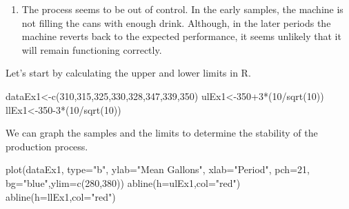 \documentclass[
  letterpaper,
  DIV=11,
  numbers=noendperiod]{scrreprt}
\newenvironment{Shaded}{\begin{snugshade}}{\end{snugshade}}
\newcommand{\AttributeTok}[1]{\textcolor[rgb]{0.40,0.45,0.13}{#1}}
\newcommand{\DecValTok}[1]{\textcolor[rgb]{0.68,0.00,0.00}{#1}}
\newcommand{\FunctionTok}[1]{\textcolor[rgb]{0.28,0.35,0.67}{#1}}
\newcommand{\NormalTok}[1]{\textcolor[rgb]{0.00,0.23,0.31}{#1}}
\newcommand{\OtherTok}[1]{\textcolor[rgb]{0.00,0.23,0.31}{#1}}
\newcommand{\SpecialCharTok}[1]{\textcolor[rgb]{0.37,0.37,0.37}{#1}}
\newcommand{\StringTok}[1]{\textcolor[rgb]{0.13,0.47,0.30}{#1}}
\providecommand{\tightlist}{%
  \setlength{\itemsep}{0pt}\setlength{\parskip}{0pt}}\usepackage{longtable,booktabs,array}
\begin{document}
\begin{blackbox}

\begin{enumerate}
\def\labelenumi{\arabic{enumi}.}
\tightlist
\item
  The process seems to be out of control. In the early samples, the
  machine is not filling the cans with enough drink. Although, in the
  later periods the machine reverts back to the expected performance, it
  seems unlikely that it will remain functioning correctly.
\end{enumerate}

\end{blackbox}

Let's start by calculating the upper and lower limits in R.

\begin{Shaded}
\begin{Highlighting}[numbers=left,,]
\NormalTok{dataEx1}\OtherTok{\textless{}{-}}\FunctionTok{c}\NormalTok{(}\DecValTok{310}\NormalTok{,}\DecValTok{315}\NormalTok{,}\DecValTok{325}\NormalTok{,}\DecValTok{330}\NormalTok{,}\DecValTok{328}\NormalTok{,}\DecValTok{347}\NormalTok{,}\DecValTok{339}\NormalTok{,}\DecValTok{350}\NormalTok{)}
\NormalTok{ulEx1}\OtherTok{\textless{}{-}}\DecValTok{350}\SpecialCharTok{+}\DecValTok{3}\SpecialCharTok{*}\NormalTok{(}\DecValTok{10}\SpecialCharTok{/}\FunctionTok{sqrt}\NormalTok{(}\DecValTok{10}\NormalTok{))}
\NormalTok{llEx1}\OtherTok{\textless{}{-}}\DecValTok{350{-}3}\SpecialCharTok{*}\NormalTok{(}\DecValTok{10}\SpecialCharTok{/}\FunctionTok{sqrt}\NormalTok{(}\DecValTok{10}\NormalTok{))}
\end{Highlighting}
\end{Shaded}

We can graph the samples and the limits to determine the stability of
the production process.

\begin{Shaded}
\begin{Highlighting}[numbers=left,,]
\FunctionTok{plot}\NormalTok{(dataEx1, }\AttributeTok{type=}\StringTok{"b"}\NormalTok{, }\AttributeTok{ylab=}\StringTok{"Mean Gallons"}\NormalTok{,}
     \AttributeTok{xlab=}\StringTok{"Period"}\NormalTok{, }\AttributeTok{pch=}\DecValTok{21}\NormalTok{, }\AttributeTok{bg=}\StringTok{"blue"}\NormalTok{,}\AttributeTok{ylim=}\FunctionTok{c}\NormalTok{(}\DecValTok{280}\NormalTok{,}\DecValTok{380}\NormalTok{))}
\FunctionTok{abline}\NormalTok{(}\AttributeTok{h=}\NormalTok{ulEx1,}\AttributeTok{col=}\StringTok{"red"}\NormalTok{)}
\FunctionTok{abline}\NormalTok{(}\AttributeTok{h=}\NormalTok{llEx1,}\AttributeTok{col=}\StringTok{"red"}\NormalTok{)}
\end{Highlighting}
\end{Shaded}
\end{document}
